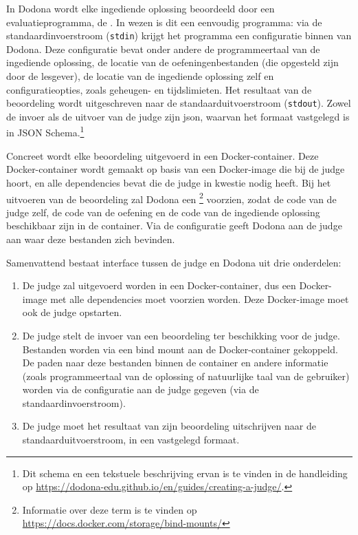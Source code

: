 In Dodona wordt elke ingediende oplossing beoordeeld door een evaluatieprogramma, de .
In wezen is dit een eenvoudig programma: via de standaardinvoerstroom (\texttt{stdin}) krijgt het programma een configuratie binnen van Dodona.
Deze configuratie bevat onder andere de programmeertaal van de ingediende oplossing, de locatie van de oefeningenbestanden (die opgesteld zijn door de lesgever), de locatie van de ingediende oplossing zelf en configuratieopties, zoals geheugen- en tijdslimieten.
Het resultaat van de beoordeling wordt uitgeschreven naar de standaarduitvoerstroom (\texttt{stdout}).
Zowel de invoer als de uitvoer van de judge zijn json, waarvan het formaat vastgelegd is in JSON Schema.\footnote{Dit schema en een tekstuele beschrijving ervan is te vinden in de handleiding op \url{https://dodona-edu.github.io/en/guides/creating-a-judge/}.}

Concreet wordt elke beoordeling uitgevoerd in een Docker-container.
Deze Docker-container wordt gemaakt op basis van een Docker-image die bij de judge hoort, en alle dependencies bevat die de judge in kwestie nodig heeft.
Bij het uitvoeren van de beoordeling zal Dodona een \footnote{Informatie over deze term is te vinden op \url{https://docs.docker.com/storage/bind-mounts/}} voorzien, zodat de code van de judge zelf, de code van de oefening en de code van de ingediende oplossing beschikbaar zijn in de container.
Via de configuratie geeft Dodona aan de judge aan waar deze bestanden zich bevinden.

Samenvattend bestaat interface tussen de judge en Dodona uit drie onderdelen:

\begin{enumerate}
    \item De judge zal uitgevoerd worden in een Docker-container, dus een Docker-image met alle dependencies moet voorzien worden.
    Deze Docker-image moet ook de judge opstarten.
    \item De judge stelt de invoer van een beoordeling ter beschikking voor de judge.
    Bestanden worden via een bind mount aan de Docker-container gekoppeld.
    De paden naar deze bestanden binnen de container en andere informatie (zoals programmeertaal van de oplossing of natuurlijke taal van de gebruiker) worden via de configuratie aan de judge gegeven (via de standaardinvoerstroom).
    \item De judge moet het resultaat van zijn beoordeling uitschrijven naar de standaarduitvoerstroom, in een vastgelegd formaat.
\end{enumerate}

